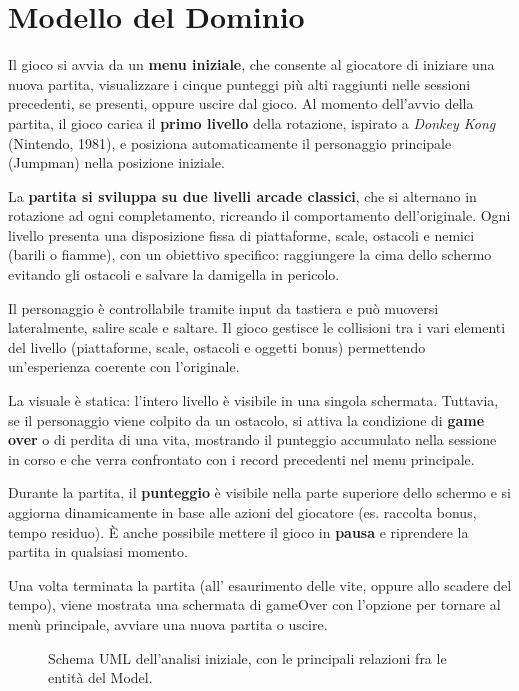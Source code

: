 \documentclass[a4paper,12pt]{report}
\begin{document}
\newpage
\section{Modello del Dominio}

Il gioco si avvia da un \textbf{menu iniziale}, che consente al giocatore di iniziare una nuova partita, visualizzare i cinque punteggi più alti raggiunti nelle sessioni
precedenti, se presenti, oppure uscire dal gioco. Al momento dell'avvio della partita, il gioco carica il \textbf{primo livello} della rotazione, ispirato a \textit{Donkey Kong} (Nintendo, 1981), e
posiziona automaticamente il personaggio principale (Jumpman) nella posizione iniziale.

La \textbf{partita si sviluppa su due livelli arcade classici}, che si alternano in rotazione ad ogni completamento, ricreando il comportamento dell'originale. Ogni livello
presenta una disposizione fissa di piattaforme, scale, ostacoli e nemici (barili o fiamme), con un obiettivo specifico: raggiungere la cima dello schermo evitando gli ostacoli e
salvare la damigella in pericolo.

Il personaggio è controllabile tramite input da tastiera e può muoversi lateralmente, salire scale e saltare. Il gioco gestisce le collisioni tra i vari elementi del livello
(piattaforme, scale, ostacoli e oggetti bonus) permettendo un'esperienza coerente con l'originale.

La visuale è statica: l'intero livello è visibile in una singola schermata. Tuttavia, se il personaggio viene colpito da un ostacolo, si attiva la condizione
di \textbf{game over} o di perdita di una vita, mostrando il punteggio accumulato nella sessione in corso e che verra confrontato con i record precedenti nel menu principale.

Durante la partita, il \textbf{punteggio} è visibile nella parte superiore dello schermo e si aggiorna dinamicamente in base alle azioni
del giocatore (es. raccolta bonus, tempo residuo). È anche possibile mettere il gioco in \textbf{pausa} e riprendere la partita in qualsiasi momento.

Una volta terminata la partita (all' esaurimento delle vite, oppure allo scadere del tempo), viene mostrata una schermata di gameOver con l'opzione per
tornare al menù principale, avviare una nuova partita o uscire.

\begin{figure}[H]
	\centering{}
	
	\caption{Schema UML dell'analisi iniziale, con le principali relazioni fra le entità del Model.}
	\label{img:model}
\end{figure}
\end{document}
